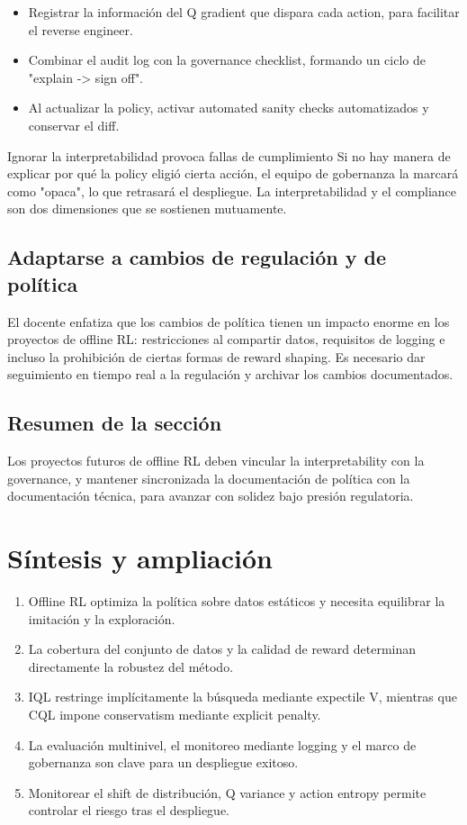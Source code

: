 \documentclass[a4paper]{article}
\begin{document}
\begin{itemize}
    \item Registrar la información del Q gradient que dispara cada action, para facilitar el reverse engineer.
    \item Combinar el audit log con la governance checklist, formando un ciclo de "explain -> sign off".
    \item Al actualizar la policy, activar automated sanity checks automatizados y conservar el diff.
\end{itemize}

\begin{warningbox}{Ignorar la interpretabilidad provoca fallas de cumplimiento}
Si no hay manera de explicar por qué la policy eligió cierta acción, el equipo de gobernanza la marcará como "opaca", lo que retrasará el despliegue. La interpretabilidad y el compliance son dos dimensiones que se sostienen mutuamente.
\end{warningbox}

\subsection{Adaptarse a cambios de regulación y de política}

El docente enfatiza que los cambios de política tienen un impacto enorme en los proyectos de offline RL: restricciones al compartir datos, requisitos de logging e incluso la prohibición de ciertas formas de reward shaping. Es necesario dar seguimiento en tiempo real a la regulación y archivar los cambios documentados.

\subsection{Resumen de la sección}

Los proyectos futuros de offline RL deben vincular la interpretability con la governance, y mantener sincronizada la documentación de política con la documentación técnica, para avanzar con solidez bajo presión regulatoria.

\section{Síntesis y ampliación}

\begin{enumerate}
    \item Offline RL optimiza la política sobre datos estáticos y necesita equilibrar la imitación y la exploración.
    \item La cobertura del conjunto de datos y la calidad de reward determinan directamente la robustez del método.
    \item IQL restringe implícitamente la búsqueda mediante expectile V, mientras que CQL impone conservatism mediante explicit penalty.
    \item La evaluación multinivel, el monitoreo mediante logging y el marco de gobernanza son clave para un despliegue exitoso.
    \item Monitorear el shift de distribución, Q variance y action entropy permite controlar el riesgo tras el despliegue.
\end{enumerate}
\end{document}
